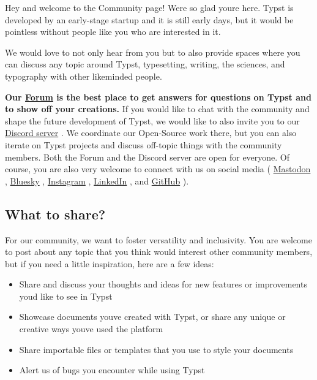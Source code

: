 Hey and welcome to the Community page! We\textquotesingle re so glad
you\textquotesingle re here. Typst is developed by an early-stage
startup and it is still early days, but it would be pointless without
people like you who are interested in it.

We would love to not only hear from you but to also provide spaces where
you can discuss any topic around Typst, typesetting, writing, the
sciences, and typography with other likeminded people.

\textbf{Our \href{https://forum.typst.app/}{Forum} is the best place to
get answers for questions on Typst and to show off your creations.} If
you would like to chat with the community and shape the future
development of Typst, we would like to also invite you to our
\href{https://discord.gg/2uDybryKPe}{Discord server} . We coordinate our
Open-Source work there, but you can also iterate on Typst projects and
discuss off-topic things with the community members. Both the Forum and
the Discord server are open for everyone. Of course, you are also very
welcome to connect with us on social media (
\href{https://mastodon.social/@typst}{Mastodon} ,
\href{https://bsky.app/profile/typst.app}{Bluesky} ,
\href{https://instagram.com/typstapp/}{Instagram} ,
\href{https://linkedin.com/company/typst}{LinkedIn} , and
\href{https://github.com/typst}{GitHub} ).

\subsection{What to share?}\label{what-to-share}

For our community, we want to foster versatility and inclusivity. You
are welcome to post about any topic that you think would interest other
community members, but if you need a little inspiration, here are a few
ideas:

\begin{itemize}
\tightlist
\item
  Share and discuss your thoughts and ideas for new features or
  improvements you\textquotesingle d like to see in Typst
\item
  Showcase documents you\textquotesingle ve created with Typst, or share
  any unique or creative ways you\textquotesingle ve used the platform
\item
  Share importable files or templates that you use to style your
  documents
\item
  Alert us of bugs you encounter while using Typst
\end{itemize}

